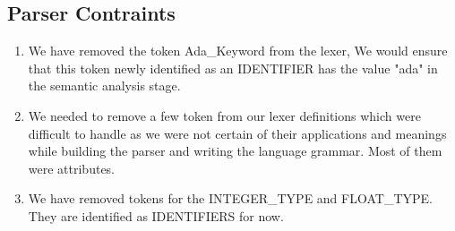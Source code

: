 \documentclass[12pt]{article}%
\begin{document}
\subsection{Parser Contraints}
\begin{enumerate}
\item We have removed the token Ada\_Keyword from the lexer, We would ensure that this token newly identified as an IDENTIFIER has the value "ada" in the semantic analysis stage. 
\item We needed to remove a few token from our lexer definitions which were difficult to handle as we were not certain of their applications and meanings while building the parser and writing the language grammar. Most of them were attributes. 
\item We have removed tokens for the INTEGER\_TYPE and FLOAT\_TYPE. They are identified as IDENTIFIERS for now.

\end{enumerate}
\end{document}
